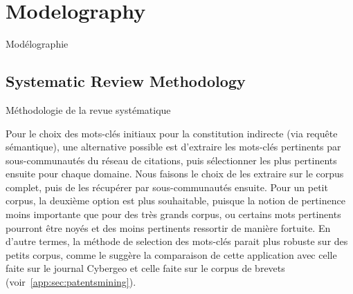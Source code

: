 \newpage

\section{Modelography}{Modélographie}

\label{app:sec:modelography}





\subsection{Systematic Review Methodology}{Méthodologie de la revue systématique}


Pour le choix des mots-clés initiaux pour la constitution indirecte (via requête sémantique), une alternative possible est d'extraire les mots-clés pertinents par sous-communautés du réseau de citations, puis sélectionner les plus pertinents ensuite pour chaque domaine. Nous faisons le choix de les extraire sur le corpus complet, puis de les récupérer par sous-communautés ensuite. Pour un petit corpus, la deuxième option est plus souhaitable, puisque la notion de pertinence moins importante que pour des très grands corpus, ou certains mots pertinents pourront être noyés et des moins pertinents ressortir de manière fortuite. En d'autre termes, la méthode de selection des mots-clés parait plus robuste sur des petits corpus, comme le suggère la comparaison de cette application avec celle faite sur le journal Cybergeo et celle faite sur le corpus de brevets (voir~\ref{app:sec:patentsmining}).






